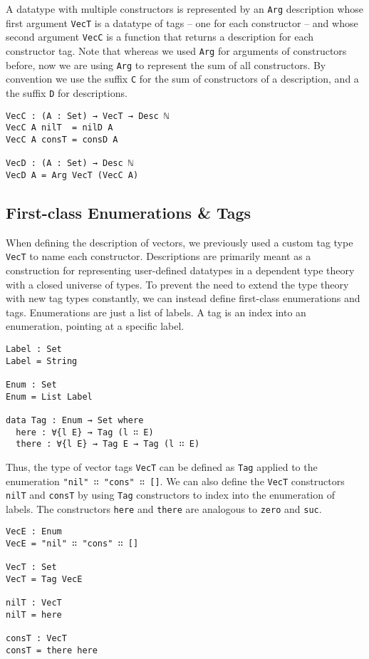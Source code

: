 \documentclass[preprint,nonatbib]{sigplanconf}
\begin{document}
A datatype with multiple constructors is represented by an
{\tt Arg} description whose first argument {\tt VecT} is a datatype of tags
-- one for each constructor -- and whose second argument {\tt VecC} is
a function that returns a description for each constructor tag. Note
that whereas we used {\tt Arg} for arguments of constructors before,
now we are using {\tt Arg} to represent the sum of all constructors.
By convention we use the suffix {\tt C} for the sum of constructors of
a description, and a the suffix {\tt D} for descriptions.

\begin{verbatim}
VecC : (A : Set) → VecT → Desc ℕ
VecC A nilT  = nilD A
VecC A consT = consD A

VecD : (A : Set) → Desc ℕ
VecD A = Arg VecT (VecC A)
\end{verbatim}

\subsection{First-class Enumerations \& Tags}
\label{sec:background:case}

When defining the description of vectors, we previously used a custom
tag type {\tt VecT} to name each constructor. Descriptions are
primarily meant as a construction for representing user-defined
datatypes in a dependent type theory with a closed universe of types.
To prevent the need to extend the type theory with new tag types
constantly, we can instead define first-class enumerations and tags.
Enumerations are just a list of labels. A tag is an index into an
enumeration, pointing at a specific label.

\begin{verbatim}
Label : Set
Label = String

Enum : Set
Enum = List Label

data Tag : Enum → Set where
  here : ∀{l E} → Tag (l ∷ E)
  there : ∀{l E} → Tag E → Tag (l ∷ E)
\end{verbatim}

Thus, the type of vector tags {\tt VecT} can be defined as
{\tt Tag} applied to the enumeration {\tt "nil" ∷ "cons" ∷ []}.
We can also define the {\tt VecT} constructors
{\tt nilT} and {\tt consT} by using
{\tt Tag} constructors to index into the enumeration of labels. The
constructors {\tt here} and {\tt there} are analogous to {\tt zero}
and {\tt suc}.

\begin{verbatim}
VecE : Enum
VecE = "nil" ∷ "cons" ∷ []

VecT : Set
VecT = Tag VecE

nilT : VecT
nilT = here

consT : VecT
consT = there here
\end{verbatim}
\end{document}
